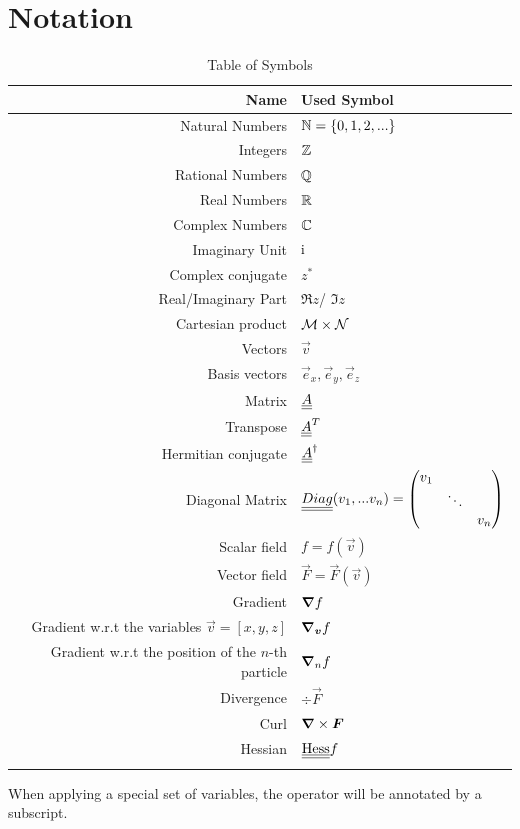 \chapter{Notation}

\renewcommand{\arraystretch}{1.3}
\begin{longtable}{|r|l|}
    \hline
        \textbf{Name} & \textbf{Used Symbol} \\ \hline 
        \hline
         Natural Numbers & $\mathbb{N} = \{ 0,1,2, ... \}$ \\ \hline
         Integers & $\mathbb{Z}$ \\ \hline
         Rational Numbers & $\mathbb{Q}$ \\ \hline
         Real Numbers & $\mathbb{R}$ \\ \hline 
         Complex Numbers & $\mathbb{C}$ \\ \hline
         Imaginary Unit & $\mathrm{i}$ \\ \hline
         Complex conjugate & $z^*$ \\ \hline
         Real/Imaginary Part & $\Re z$/ $\Im z$ \\ \hline
         Cartesian product & $\mathcal{M} \times \mathcal{N}$ \\ \hline
         Vectors & $\vec v$ \\ \hline
         Basis vectors & $\vec e_x, \vec e_y, \vec e_z$ \\ \hline
         Matrix & $\underline{\underline{A}}$ \\ \hline
         Transpose & $\underline{\underline{A}}^T$ \\ \hline
         Hermitian conjugate & $\underline{\underline{A}}^\dagger$ \\ \hline
         Diagonal Matrix & $\underline{\underline{Diag}}(v_1, ... v_n) = \begin{pmatrix}
             v_1 \\
             & \ddots \\
             & & v_n
         \end{pmatrix}$ \\ \hline
         Scalar field & $f = f(\vec v)$ \\ \hline
         Vector field & $\vec F = \vec F(\vec v)$ \\ \hline
         Gradient & $\bm{\nabla} f$ \\ \hline
         Gradient w.r.t the variables $\vec v = [x,y,z]$ & $\bm{\nabla}_{\bm{v}} f$ \\ \hline
         Gradient w.r.t the position of the $n$-th particle & $\bm{\nabla}_n f$ \\ \hline
         Divergence & $\div \vec F$ \\ \hline
         Curl & $\bm{\nabla} \times \bm{F}$ \\ \hline
         Hessian & $\underline{\underline{\mathrm{Hess}}} f$ \\ \hline
    \caption{Table of Symbols}
    \label{tab:apdx:not:symb}
\end{longtable}
\renewcommand{\arraystretch}{1.0}
When applying a special set of variables,
    the operator will be annotated by a subscript.


